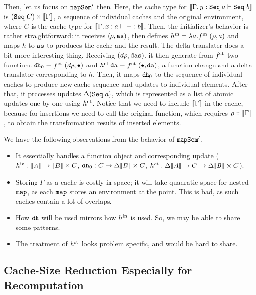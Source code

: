 \documentclass{article}
\theoremstyle{definition}
\begin{document}
Then, let us focus on $\texttt{mapSem}'$ then. Here, the cache type for $\sem{ \Gamma, y : \con{Seq} \A a \vdash \con{Seq} \A b }$ 
is $(\con{Seq} \A C) \x \sem{\Gamma}$, a sequence of individual caches and the original environment, where $C$ is the cache type for 
$\sem{ \Gamma, x : a \vdash - : b }$. Then, the initializer's behavior is rather straightforward: it receives $(\rho, \texttt{as})$,
then defines $h^{\text{in}} = \lambda a.f^{\text{in}} \; (\rho,a)$ and maps $h$ to $\texttt{as}$ to produces the cache and the result. 
The delta translator does a bit more interesting thing. Receiving $(d\rho, \texttt{das})$, 
it then generate from $f^{\text{ct}}$ two functions $\texttt{dh}_0 = f^{\text{ct}} \; (d\rho, {\bullet})$ and 
$h^{\text{ct}} \; \texttt{da} = f^{\text{ct}} \; ({\bullet}, \texttt{da})$, a function change and a delta translator corresponding to $h$. 
Then, it maps $\texttt{dh}_0$ to the sequence of individual caches to produce new cache sequence and updates to individual elements.
After that, it processes updates $\Delta (\texttt{Seq} \; a)$, which is represented as a list of atomic updates one by one using $h^{\text{ct}}$. 
Notice that we need to include $\sem{\Gamma}$ in the cache, because for insertions we need to call the original function, which requires $\rho :: \sem{\Gamma}$, to obtain the transformation results of inserted elements. 

We have the following observations from the behavior of $\texttt{mapSem}'$. 
\begin{itemize}
 \item It essentially handles a function object and corresponding update ($\init{h} : \sem{A} \to \sem{B} \x C$, $\var{dh}_0 : C \to \Delta \sem{B} \x C$, $\cts{h} : \Delta \sem{A} \to C \to \Delta \sem{B} \x C$).
 \item Storing $\Gamma$ as a cache is costly in space; it will take quadratic space for nested $\texttt{map}$, as each $\texttt{map}$ stores 
   an environment at the point. This is bad, as such caches contain a lot of overlaps. 
 \item How $\texttt{dh}$ will be used mirrors how $h^{\text{in}}$ is used. So, we may be able to share some patterns. 
 \item The treatment of $h^{\text{ct}}$ looks problem specific, and would be hard to share. 
\end{itemize}


\subsection{Cache-Size Reduction Especially for Recomputation}
\label{sec:cache-size-optimized-version}
\end{document}
